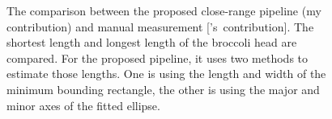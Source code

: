 \begin{figure}[htb!]
  \begin{center}
  \end{center}
  \caption[The comparison between the proposed close-range pipeline and manual measurement]{
    The comparison between the proposed close-range pipeline (my contribution) and manual measurement [\mbox{\citet{nishida_estimation_2023}'s contribution]}. The shortest length and longest length of the broccoli head are compared. For the proposed pipeline, it uses two methods to estimate those lengths. One is using the length and width of the minimum bounding rectangle, the other is using the major and minor axes of the fitted ellipse.
  }
  \label{fig:des_compare}
\end{figure}